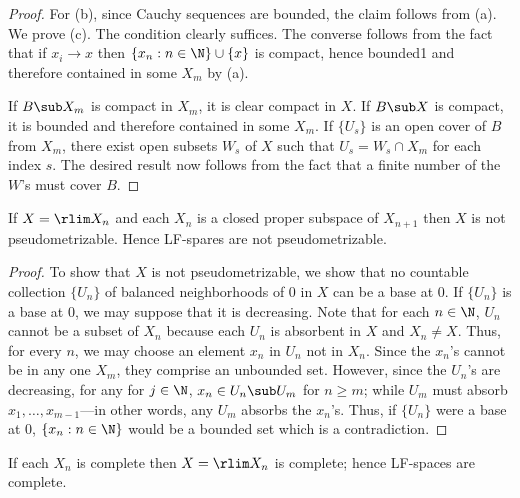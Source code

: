 \begin{proof}
For (b), since Cauchy sequences are bounded, the claim follows from (a). We prove (c). The condition clearly suffices. The converse follows from the fact that if $x_i\to x$ then $\{x_n:n\in\N\}\cup\{x\}$ is compact, hence bounded1 and therefore contained in some $X_m$ by (a).\par
If $B\sub X_m$ is compact in $X_m$, it is clear compact in $X$. If $B\sub X$ is compact, it is bounded and therefore contained in some $X_m$. If $\{U_s\}$ is an open cover of $B$ from $X_m$, there exist open subsets $W_s$ of $X$ such that $U_s=W_s\cap X_m$ for each index $s$. The desired result now follows from the fact that a finite number of the $W$'s must cover $B$.
\end{proof}
\begin{proposition}\label{LCS LF-space nonmetrizable}
If $X=\rlim X_n$ and each $X_n$ is a closed proper subspace of $X_{n+1}$ then $X$ is not pseudometrizable. Hence LF-spares are not pseudometrizable.
\end{proposition}
\begin{proof}
To show that $X$ is not pseudometrizable, we show that no countable collection $\{U_n\}$ of balanced neighborhoods of $0$ in $X$ can be a base at $0$. If $\{U_n\}$ is a base at $0$, we may suppose that it is decreasing. Note that for each $n\in\N$, $U_n$ cannot be a subset of $X_n$ because each $U_n$ is absorbent in $X$ and $X_n\neq X$. Thus, for every $n$, we may choose an element $x_n$ in $U_n$ not in $X_n$. Since the $x_n$'s cannot be in any one $X_m$, they comprise an unbounded set. However, since the $U_n$'s are decreasing, for any for $j\in\N$, $x_n\in U_n\sub U_m$ for $n\geq m$; while $U_m$ must absorb $x_1,\dots,x_{m-1}$---in other words, any $U_m$ absorbs the $x_n$'s. Thus, if $\{U_n\}$ were a base at $0$, $\{x_n:n\in\N\}$ would be a bounded set which is a contradiction.
\end{proof}
\begin{proposition}\label{LCS strict inductive limit topo complete}
If each $X_n$ is complete then $X=\rlim X_n$ is complete; hence LF-spaces are complete.
\end{proposition}
